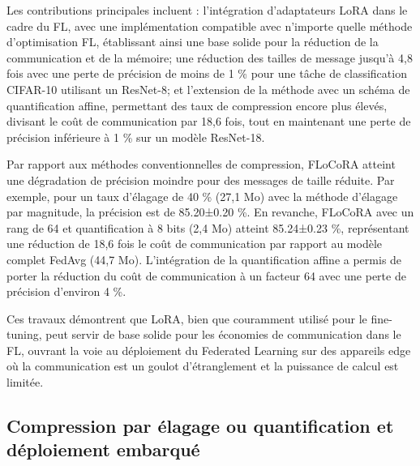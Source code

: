 \documentclass[11pt]{report}
\begin{document}
Les contributions principales incluent : l'intégration d'adaptateurs LoRA dans le cadre du FL, avec une implémentation compatible avec n'importe quelle méthode d'optimisation FL, établissant ainsi une base solide pour la réduction de la communication et de la mémoire; une réduction des tailles de message jusqu'à 4,8 fois avec une perte de précision de moins de 1 \% pour une tâche de classification CIFAR-10 utilisant un ResNet-8; et l'extension de la méthode avec un schéma de quantification affine, permettant des taux de compression encore plus élevés, divisant le coût de communication par 18,6 fois, tout en maintenant une perte de précision inférieure à 1 \% sur un modèle ResNet-18.

Par rapport aux méthodes conventionnelles de compression, FLoCoRA atteint une dégradation de précision moindre pour des messages de taille réduite. Par exemple, pour un taux d'élagage de 40 \% (27,1 Mo) avec la méthode d'élagage par magnitude, la précision est de 85.20±0.20 \%. En revanche, FLoCoRA avec un rang de 64 et quantification à 8 bits (2,4 Mo) atteint 85.24±0.23 \%, représentant une réduction de 18,6 fois le coût de communication par rapport au modèle complet FedAvg (44,7 Mo). L'intégration de la quantification affine a permis de porter la réduction du coût de communication à un facteur 64 avec une perte de précision d'environ 4 \%.

Ces travaux démontrent que LoRA, bien que couramment utilisé pour le fine-tuning, peut servir de base solide pour les économies de communication dans le FL, ouvrant la voie au déploiement du Federated Learning sur des appareils edge où la communication est un goulot d'étranglement et la puissance de calcul est limitée.


\subsection{Compression par élagage ou quantification et déploiement embarqué}
\end{document}
